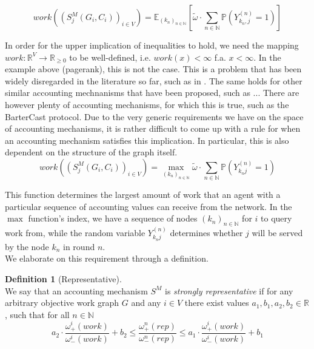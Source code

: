 \documentclass[11pt,a4paper]{report}
\theoremstyle{definition}
\newtheorem{definition}{Definition}[section]
\theoremstyle{theorem}
\theoremstyle{proposition}
\theoremstyle{corollary}
\theoremstyle{lemma}
\theoremstyle{example}
\theoremstyle{remark}
\begin{document}
\[
work\left((S^M_j(G_i,C_i))_{i\in{}V}\right) = \mathbb{E}_{(k_n)_{n\in\mathbb{N}}}[\tilde{\omega}\cdot\sum\limits_{n\in\mathbb{N}}\mathbb{P}(Y^{(n)}_{k_n,j}=1)]
\]





\noindent{}In order for the upper implication of inequalities to hold, we need the mapping $work:\mathbb{R}^{V}\rightarrow\mathbb{R}_{\geq{}0}$ to be well-defined, i.e. $work(x)<\infty$ f.a. $x<\infty$. In the example above (pagerank), this is not the case. This is a problem that has been widely disregarded in the literature so far, such as in \cite{A Random Walk Based Trust Ranking in Distributed Systems}. The same holds for other similar accounting mechnanisms that have been proposed, such as ... There are however plenty of accounting mechanisms, for which this is true, such as the BarterCast protocol. Due to the very generic requirements we have on the space of accounting mechanisms, it is rather difficult to come up with a rule for when an accounting mechanism satisfies this implication. In particular, this is also dependent on the structure of the graph itself. \vspace{1em}\\


\[
work\left((S^M_j(G_i,C_i))_{i\in{}V}\right) = \max\limits_{(k_n)_{n\in\mathbb{N}}}\tilde{\omega}\cdot{}\sum\limits_{n\in\mathbb{N}}\mathbb{P}(Y^{(n)}_{k_nj}=1)
\]

\noindent{}This function determines the largest amount of work that an agent with a particular sequence of accounting values can receive from the network. In the $\max$ function's index, we have a sequence of nodes $(k_n)_{n\in\mathbb{N}}$ for $i$ to query work from, while the random variable $Y^{(n)}_{k_nj}$ determines whether $j$ will be served by the node $k_n$ in round $n$. \vspace{1em}\\


\noindent{}We elaborate on this requirement through a definition.
\begin{definition}[Representative]\ \\
We say that an accounting mechanism $S^M$ is {\it strongly representative} if for any arbitrary objective work graph $G$ and any $i\in{}V$ there exist values $a_1,b_1,a_2,b_2\in\mathbb{R}$, such that for all $n\in\mathbb{N}$  
\[
a_2\cdot{}\frac{\omega^i_{+}(work)}{\omega^i_{-}(work)} + b_2 \leq \frac{\omega^n_{+}(rep)}{\omega^n_{-}(rep)} \leq a_1\cdot{}\frac{\omega^i_{+}(work)}{\omega^i_{-}(work)} + b_1
\]
\end{definition}
\end{document}
